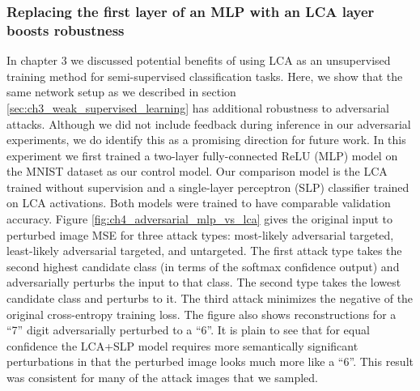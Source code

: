 \subsubsection{Replacing the first layer of an MLP with an LCA layer boosts robustness}
In chapter 3 we discussed potential benefits of using LCA as an unsupervised training method for semi-supervised classification tasks. %
Here, we show that the same network setup as we described in section \ref{sec:ch3_weak_supervised_learning} has additional robustness to adversarial attacks.
Although we did not include feedback during inference in our adversarial experiments, we do identify this as a promising direction for future work.
In this experiment we first trained a two-layer fully-connected ReLU (MLP) model on the MNIST dataset as our control model.
Our comparison model is the LCA trained without supervision and a single-layer perceptron (SLP) classifier trained on LCA activations.
Both models were trained to have comparable validation accuracy.
Figure \ref{fig:ch4_adversarial_mlp_vs_lca} gives the original input to perturbed image MSE for three attack types: most-likely adversarial targeted, least-likely adversarial targeted, and untargeted.
The first attack type takes the second highest candidate class (in terms of the softmax confidence output) and adversarially perturbs the input to that class.
The second type takes the lowest candidate class and perturbs to it.
The third attack minimizes the negative of the original cross-entropy training loss.
The figure also shows reconstructions for a ``7'' digit adversarially perturbed to a ``6''.
It is plain to see that for equal confidence the LCA+SLP model requires more semantically significant perturbations in that the perturbed image looks much more like a ``6''.
This result was consistent for many of the attack images that we sampled.

